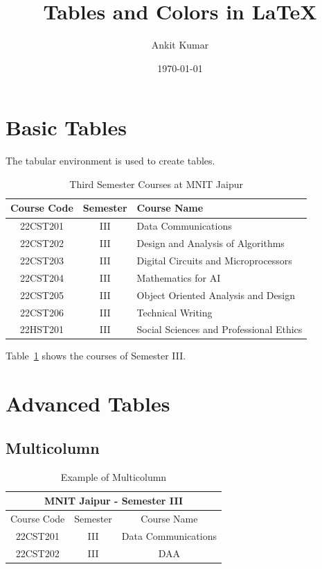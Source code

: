 \documentclass{article}
\title{Tables and Colors in LaTeX}
\author{Ankit Kumar}
\date{\today}
\begin{document}
\maketitle

\section{Basic Tables}

The tabular environment is used to create tables.

\begin{table}[h!]
    \centering
    \begin{tabular}{|c|c|l|}
        \hline
        \textbf{Course Code} & \textbf{Semester} & \textbf{Course Name} \\
        \hline
        22CST201 & III & Data Communications \\
        22CST202 & III & Design and Analysis of Algorithms \\
        22CST203 & III & Digital Circuits and Microprocessors \\
        22CST204 & III & Mathematics for AI \\
        22CST205 & III & Object Oriented Analysis and Design \\
        22CST206 & III & Technical Writing \\
        22HST201 & III & Social Sciences and Professional Ethics \\
        \hline
    \end{tabular}
    \caption{Third Semester Courses at MNIT Jaipur}
    \label{tab:courses}
\end{table}

Table~\ref{tab:courses} shows the courses of Semester III.

\section{Advanced Tables}

\subsection{Multicolumn}

\begin{table}[h!]
    \centering
    \begin{tabular}{|c|c|c|}
        \hline
        \multicolumn{3}{|c|}{\textbf{MNIT Jaipur - Semester III}} \\
        \hline
        Course Code & Semester & Course Name \\
        \hline
        22CST201 & III & Data Communications \\
        22CST202 & III & DAA \\
        \hline
    \end{tabular}
    \caption{Example of Multicolumn}
\end{table}
\end{document}
